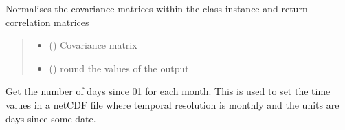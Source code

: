 \documentclass[letterpaper,10pt,english]{sphinxmanual}
\begin{document}
\begin{fulllineitems}
\label{\detokenize{misc:glomar_gridding.utils.cov_2_cor}}
\pysigstartsignatures
\pysiglinewithargsret
{}
{\sphinxparamcomma {}}
{}
\pysigstopsignatures
\sphinxAtStartPar
Normalises the covariance matrices within the class instance
and return correlation matrices
\begin{quote}\begin{description}
\begin{itemize}
\item {}
\sphinxAtStartPar
{} () \textendash{} Covariance matrix

\item {}
\sphinxAtStartPar
{} () \textendash{} round the values of the output

\end{itemize}

\sphinxAtStartPar
{}

\end{description}\end{quote}

\end{fulllineitems}


\begin{fulllineitems}
\label{\detokenize{misc:glomar_gridding.utils.days_since_by_month}}
\pysigstartsignatures
\pysiglinewithargsret
{}
{\sphinxparamcomma {}}
{}
\pysigstopsignatures
\sphinxAtStartPar
Get the number of days since \sphinxhyphen{}01\sphinxhyphen{} for each month. This is used
to set the time values in a netCDF file where temporal resolution is monthly
and the units are days since some date.
\begin{quote}\begin{description}
\sphinxAtStartPar
{}

\end{description}\end{quote}

\end{fulllineitems}
\end{document}
